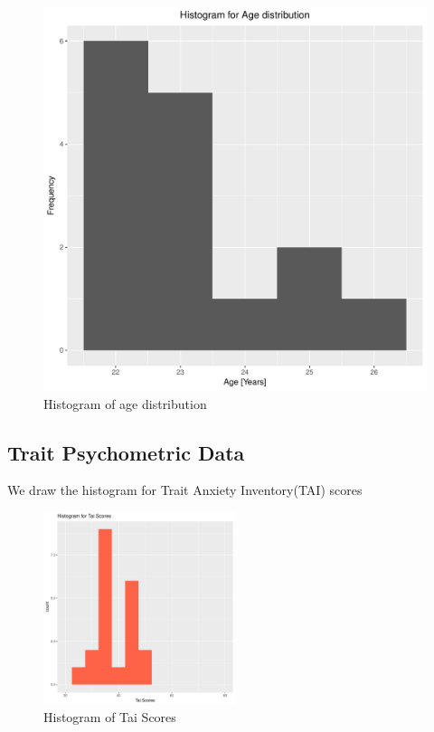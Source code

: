 \documentclass[12pt,epsf]{report}
\begin{document}
\begin{figure}[!htb]
\begin{minipage}[c]{0.5\linewidth}
	\includegraphics[width=\linewidth]{1_age.pdf}
	\caption{Histogram of age distribution}
	\end{minipage}
\end{figure}

\subsection*{Trait Psychometric Data}
We draw the histogram for Trait Anxiety Inventory(TAI) scores\\
\begin{figure}[!htb]
	\centering
	\includegraphics[width=0.5\textwidth]{tai_plot.pdf}
	\caption{Histogram of Tai Scores}
	\centering
\end{figure}
\newpage
\end{document}
